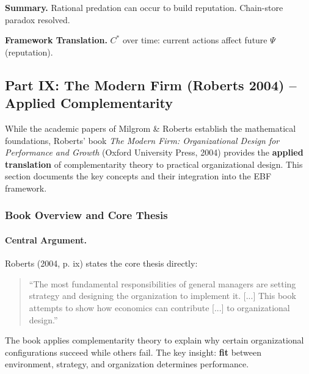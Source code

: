 \textbf{Summary.}
Rational predation can occur to build reputation. Chain-store paradox resolved.

\textbf{Framework Translation.}
$C^*$ over time: current actions affect future $\Psi$ (reputation).


\subsection{Part IX: The Modern Firm (Roberts 2004) -- Applied Complementarity}
\label{sec:modern-firm}

While the academic papers of Milgrom \& Roberts establish the mathematical foundations,
Roberts' book \textit{The Modern Firm: Organizational Design for Performance and Growth}
(Oxford University Press, 2004) provides the \textbf{applied translation} of complementarity
theory to practical organizational design. This section documents the key concepts and
their integration into the EBF framework.

\subsubsection{Book Overview and Core Thesis}

\paragraph{Central Argument.}
Roberts (2004, p. ix) states the core thesis directly:
\begin{quote}
``The most fundamental responsibilities of general managers are setting strategy 
and designing the organization to implement it. [...] This book attempts to show 
how economics can contribute [...] to organizational design.''
\end{quote}

The book applies complementarity theory to explain why certain organizational 
configurations succeed while others fail. The key insight: \textbf{fit} between 
environment, strategy, and organization determines performance.

